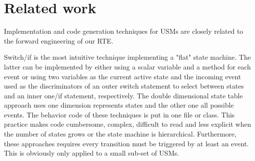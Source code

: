 \section{Related work}
\label{sec:relatedwork}
Implementation and code generation techniques for USMs are closely related to the forward engineering of our RTE.


Switch/if is the most intuitive technique implementing a "flat" state machine. The latter can be implemented by either
using a scalar variable \cite{Booch1998} and a method for each event or using two variables as the current active state and the incoming event used as the discriminators of an outer switch statement to select between states and an inner one/if statement, respectively. The double dimensional state table approach \cite{Douglass1999} uses one dimension represents states and the other one all possible events. 
The behavior code of these techniques is put in one file or class. This practice makes code cumbersome, complex, difficult to read and less explicit when the number of states grows or the state machine is hierarchical. 
Furthermore, these approaches requires every transition must be triggered by at least an event. This is obviously only applied to a small sub-set of USMs.  

